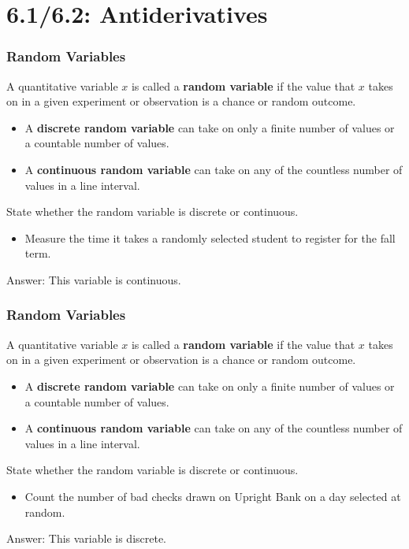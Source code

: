 \documentclass[Lecture.tex]{subfiles}
\begin{document}
\section{6.1/6.2: Antiderivatives}

\begin{frame}
\frametitle{Random Variables}\pause
\begin{definition}
A quantitative variable $x$ is called a \textbf{random variable} if the value that $x$ takes on in a given experiment or observation is a chance or random outcome.\pause
\begin{itemize}
\item A \textbf{discrete random variable} can take on only a finite number of values or a countable number of values.\pause
\item A \textbf{continuous random variable} can take on any of the countless number of values in a line interval.
\end{itemize}
\end{definition}\pause
\begin{example}
State whether the random variable is discrete or continuous.
\begin{itemize}
\item Measure the time it takes a randomly selected student to register for the fall term.
\end{itemize}\pause
\begin{flushright}Answer: This variable is continuous.\end{flushright}
\end{example}
\end{frame}

\begin{frame}
\frametitle{Random Variables}
\begin{definition}
A quantitative variable $x$ is called a \textbf{random variable} if the value that $x$ takes on in a given experiment or observation is a chance or random outcome.
\begin{itemize}
\item A \textbf{discrete random variable} can take on only a finite number of values or a countable number of values.
\item A \textbf{continuous random variable} can take on any of the countless number of values in a line interval.
\end{itemize}
\end{definition}
\begin{example}
State whether the random variable is discrete or continuous.
\begin{itemize}
\item Count the number of bad checks drawn on Upright Bank on a day selected at random.
\end{itemize}\pause
\begin{flushright}Answer: This variable is discrete.\end{flushright}
\end{example}
\end{frame}
\end{document}
